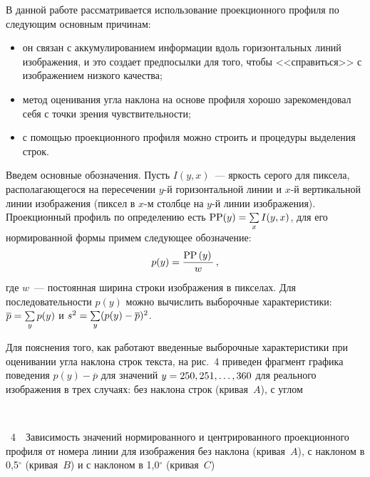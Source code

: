 \begin{multicols}{2}
      В данной работе рассматривается использование проекционного профиля по 
следующим основным причинам: 
      \begin{itemize}
\item он связан с аккумулированием информации вдоль горизонтальных линий 
изображения, и это создает предпосылки для того, чтобы <<справиться>> с 
изображением низкого качества;
\item метод оценивания угла наклона на основе профиля хорошо зарекомендовал себя 
с точки зрения чувствительности; 
\item с помощью проекционного профиля можно строить и процедуры выделения 
строк.
\end{itemize}

      Введем основные обозначения. Пусть $I(y,x)$~--- яркость серого для пиксела, 
располагающегося на пересечении $y$-й горизонтальной линии и $x$-й вертикальной 
линии изображения (пиксел в $x$-м столбце на $y$-й линии изображения). Проекционный 
профиль по определению есть $\mathrm{PP}(y)\hm=\sum\limits_x I(y,x)$, для его нормированной 
формы примем следующее обозначение: 
      $$
      p(y)=\displaystyle\frac{\displaystyle \mathrm{PP}\left(y\right)\mathstrut}{\displaystyle w\mathstrut}\,,
      $$
где $w$~--- постоянная ширина строки изображения в пикселах. Для последовательности 
$p(y)$ можно вычислить выборочные характеристики: $\overline{p}\hm=\sum\limits_y 
p(y)$ и $s^2\hm=\sum\limits_y (p(y)-\overline{p})^2$.
      
      Для пояснения того, как работают введенные выборочные характеристики при 
оценивании угла наклона строк текста, на рис.~4 приведен фрагмент графика поведения 
$p(y)-\overline{p}$ для значений $y\hm=250, 251, \ldots , 360$ для реального изображения 
в трех случаях: без наклона строк (кривая~$A$), с углом\linebreak\vspace*{-12pt}

\noindent
\vspace*{1pt}
\begin{center}  %
 \mbox{%
 \epsfxsize=67.136mm
 }
 \end{center}
{{\figurename~4}\ \ \small{Зависимость значений нормированного и центрированного проекционного профиля от 
номера линии для изображения без наклона (кривая~$A$), с наклоном в 0,5$^\circ$ (кривая~$B$) и 
с наклоном в 1,0$^\circ$ (кривая~$C$)}}





\end{multicols}
